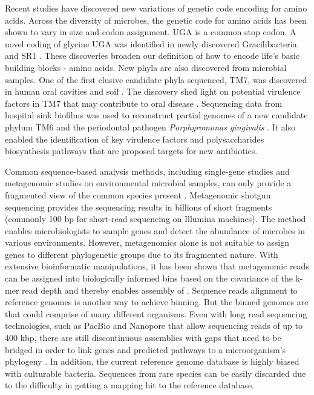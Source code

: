 Recent studies have discovered new variations of genetic code encoding for amino acids. Across the diversity of microbes, the genetic code for amino acids has been shown to vary in size and codon assignment\cite{Prat:2012ef}. UGA is a common stop codon. A novel coding of glycine UGA was identified in newly discovered Gracilibacteria and SR1 \cite{Rinke:2013bt,Campbell:2016jq}. These discoveries broaden our definition of how to encode life's basic building blocks - amino acids. New phyla are also discovered from microbial samples. One of the first elusive candidate phyla sequenced, TM7, was discovered in human oral cavities \cite{Marcy:2007il} and soil \cite{Podar:2009ks}. The discovery shed light on potential virulence factors in TM7 that may contribute to oral disease \cite{Marcy:2007il}. Sequencing data from hospital sink biofilms was used to reconstruct partial genomes of a new candidate phylum TM6 and the periodontal pathogen \textit{Porphyromonas gingivalis} \cite{McLean:2013ev,McLean:2013kq}. It also enabled the identification of key virulence factors and polysaccharides biosynthesis pathways that are proposed targets for new antibiotics. 


Common sequence-based analysis methods, including single-gene studies and metagenomic studies on environmental microbial samples, can only provide a fragmented view of the common species present \cite{Blainey:2013dp}. Metagenomic shotgun sequencing provides the sequencing results in billions of short fragments (commonly 100 bp for short-read sequencing on Illumina machines). The method enables microbiologists to sample genes and detect the abundance of microbes in various environments. However, metagenomics alone is not suitable to assign genes to different phylogenetic groups due to its fragmented nature. With extensive bioinformatic manipulations, it has been shown that metagenomic reads can be assigned into biologically informed bins based on the covariance of the k-mer read depth and thereby enables assembly of  \cite{Cleary:2015um}. Sequence reads alignment to reference genomes is another way to achieve binning. But the binned genomes are  that could comprise of many different organisms. Even with long read sequencing technologies, such as PacBio and Nanopore that allow sequencing reads of up to 400 kbp, there are still discontinuous assemblies with gaps that need to be bridged in order to link genes and predicted pathways to a microorganism's phylogeny \cite{Clingenpeel:2015bf}. In addition, the current reference genome database is highly biased with culturable bacteria. Sequences from rare species can be easily discarded due to the difficulty in getting a mapping hit to the reference database.

